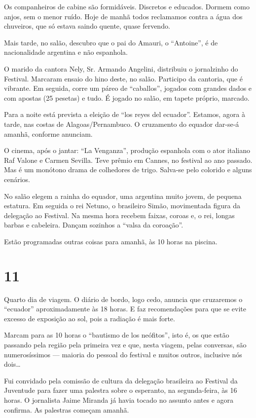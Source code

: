 Os companheiros de cabine são formidáveis. Discretos e educados. Dormem como anjos, sem o menor ruído. Hoje de manhã todos reclamamos contra a água dos chuveiros, que só estava saindo quente, quase fervendo.

Mais tarde, no salão, descubro que o pai do Amauri, o ``Antoine'', é de nacionalidade argentina e não espanhola.

O marido da cantora Nely, Sr. Armando Angelini, distribuiu o jornalzinho do Festival. Marcaram ensaio do hino deste, no salão. Participo da cantoria, que é vibrante. Em seguida, corre um páreo de ``caballos'', jogados com grandes dados e com apostas (25 pesetas) e tudo. É jogado no salão, em tapete próprio, marcado.

Para a noite está prevista a eleição de ``los reyes del ecuador''. Estamos, agora à tarde, nas costas de Alagoas/Pernambuco. O cruzamento do equador dar-se-á amanhã, conforme anunciam.

O cinema, após o jantar: ``La Venganza'', produção espanhola com o ator italiano Raf Valone e Carmen Sevilla. Teve prêmio em Cannes, no festival ao ano passado. Mas é um monótono drama de colhedores de trigo. Salva-se pelo colorido e alguns cenários.

No salão elegem a rainha do equador, uma argentina muito jovem, de pequena estatura. Em seguida o rei Netuno, o brasileiro Simão, movimentada figura da delegação ao Festival. Na mesma hora recebem faixas, coroas e, o rei, longas barbas e cabeleira. Dançam sozinhos a ``valsa da coroação''.

Estão programadas outras coisas para amanhã, às 10 horas na piscina.

\section*{11 \adfflatleafright {}}

Quarto dia de viagem. O diário de bordo, logo cedo, anuncia que cruzaremos o ``ecuador'' aproximadamente às 18 horas. E faz recomendações para que se evite excesso de exposição ao sol, pois a radiação é mais forte.

Marcam para as 10 horas o ``bautismo de los neófitos'', isto é, os que estão passando pela região pela primeira vez e que, nesta viagem, pelas conversas, são numerosíssimos --- maioria do pessoal do festival e muitos outros, inclusive nós dois\ldots

Fui convidado pela comissão de cultura da delegação brasileira ao Festival da Juventude para fazer uma palestra sobre o esperanto, na segunda-feira, às 16 horas. O jornalista Jaime Miranda já havia tocado no assunto antes e agora confirma. As palestras começam amanhã.

